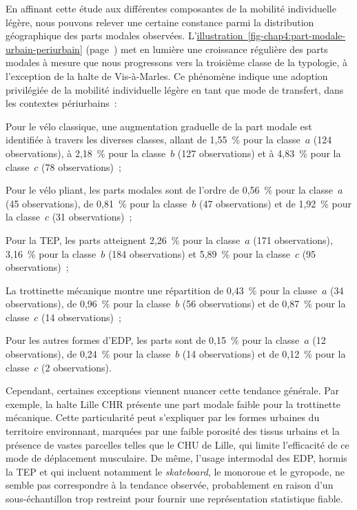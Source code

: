 \begin{refsegment}
En affinant cette étude aux différentes composantes de la mobilité individuelle légère, nous pouvons relever une certaine constance parmi la distribution géographique des parts modales observées. L'\hyperref[fig-chap4:part-modale-urbain-periurbain]{illustration~\ref{fig-chap4:part-modale-urbain-periurbain}} (page~\pageref{fig-chap4:part-modale-urbain-periurbain}) met en lumière une croissance régulière des parts modales à mesure que nous progressons vers la troisième classe de la typologie, à l'exception de la halte de Vis-à-Marles. Ce phénomène indique une adoption privilégiée de la mobilité individuelle légère en tant que mode de transfert, dans les contextes périurbains~:
    \begin{customitemize}
\item Pour le vélo classique, une augmentation graduelle de la part modale est identifiée à travers les diverses classes, allant de 1,55~\% pour la classe~\(a\) (124 observations), à 2,18~\% pour la classe~\(b\) (127 observations) et à 4,83~\% pour la classe~\(c\) (78 observations)~;
\item Pour le vélo pliant, les parts modales sont de l'ordre de 0,56~\% pour la classe~\(a\) (45 observations), de 0,81~\% pour la classe~\(b\) (47 observations) et de 1,92~\% pour la classe~\(c\) (31 observations)~;
\item Pour la \acrshort{TEP}, les parts atteignent 2,26~\% pour la classe~\(a\) (171 observations), 3,16~\% pour la classe~\(b\) (184 observations) et 5,89~\% pour la classe~\(c\) (95 observations)~;
\item La trottinette mécanique montre une répartition de 0,43~\% pour la classe~\(a\) (34 observations), de 0,96~\% pour la classe~\(b\) (56 observations) et de 0,87~\% pour la classe~\(c\) (14 observations)~;
\item Pour les autres formes d'\acrshort{EDP}, les parts sont de 0,15~\% pour la classe~\(a\) (12 observations), de 0,24~\% pour la classe~\(b\) (14 observations) et de 0,12~\% pour la classe~\(c\) (2 observations).
    \end{customitemize}%

Cependant, certaines exceptions viennent nuancer cette tendance générale. Par exemple, la halte Lille CHR présente une part modale faible pour la trottinette mécanique. Cette particularité peut s'expliquer par les formes urbaines du territoire environnant, marquées par une faible porosité des tissus urbains et la présence de vastes parcelles telles que le \acrfull{CHU} de Lille, qui limite l'efficacité de ce mode de déplacement musculaire. De même, l'usage intermodal des \acrshort{EDP}, hormis la \acrshort{TEP} et qui incluent notamment le \textsl{skateboard}, le monoroue et le gyropode, ne semble pas correspondre à la tendance observée, probablement en raison d'un sous-échantillon trop restreint pour fournir une représentation statistique fiable.%


\end{refsegment}
